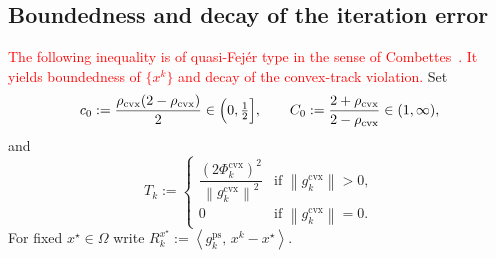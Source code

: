 \documentclass[]{interact}
\theoremstyle{plain}
\theoremstyle{definition}
\theoremstyle{remark}
\newcommand{\norm}[1]{\left\lVert #1 \right\rVert}
\newcommand{\inner}[2]{\left\langle #1,\, #2 \right\rangle}
\newcommand{\cvx}{\mathrm{cvx}}
\newcommand{\ps}{\mathrm{ps}}
\begin{document}
\subsection{Boundedness and decay of the iteration error}\label{ssec:bounded}
\leavevmode\textcolor{red}{The following inequality is of quasi-Fej\'er type in the sense of
Combettes~\citep{combettes2001quasifejer}. It yields boundedness of $\{x^k\}$ and decay of the
convex-track violation.} Set
\begin{equation}\label{eq:c0C0}
c_0:=\frac{\rho_{\cvx}(2-\rho_{\cvx})}{2}\in\Bigl(0,\tfrac12\Bigr],\qquad
C_0:=\frac{2+\rho_{\cvx}}{2-\rho_{\cvx}}\in(1,\infty),
\end{equation}
and
\begin{equation}\label{eq:Tk}
T_k:=\begin{cases}\dfrac{(2\Phi^{\cvx}_k)^2}{\norm{g^{\cvx}_k}^2} & \text{if }\norm{g^{\cvx}_k}>0,\\ 0 & \text{if }\norm{g^{\cvx}_k}=0.\end{cases}
\end{equation}
For fixed $x^\star\in\Omega$ write $R^{x^\star}_k:=\inner{g^{\ps}_k}{x^k-x^\star}$.
\end{document}
